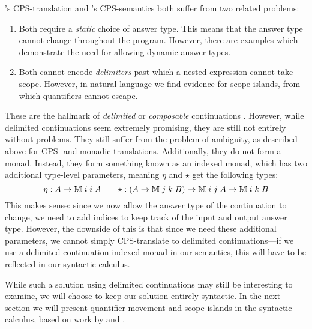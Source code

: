 \vspace*{1\baselineskip}

\citeauthor{barker2004}'s CPS-translation and
\citeauthor{moortgat2012}'s CPS-semantics both suffer from two related
problems:
\begin{enumerate}
\item Both require a \emph{static} choice of answer type. This
  means that the answer type cannot change throughout the
  program. However, there are examples which demonstrate the need for
  allowing dynamic answer types.
\item Both cannot encode \emph{delimiters} past which a nested
  expression cannot take scope. However, in natural language we find
  evidence for scope islands, from which quantifiers cannot escape.
\end{enumerate}
These are the hallmark of \emph{delimited} or \emph{composable}
continuations \citep{danvy1990}. However, while delimited
continuations seem extremely promising, they are still not entirely
without problems. They still suffer from the problem of ambiguity, as
described above for CPS- and monadic translations. Additionally, they
do not form a monad. Instead, they form something known as an indexed
monad, which has two additional type-level parameters, meaning $\eta$
and $\star$ get the following types:
\[
  \eta : A\rightarrow\mathbb{M}\;i\;i\;A
  \qquad
  \star: (A\rightarrow\mathbb{M}\;j\;k\;B)\rightarrow\mathbb{M}\;i\;j\;A\rightarrow\mathbb{M}\;i\;k\;B
\]
This makes sense: since we now allow the answer type of the
continuation to change, we need to add indices to keep track of the
input and output answer type. However, the downside of this is that
since we need these additional parameters, we cannot simply
CPS-translate to delimited continuations---if we use a delimited
continuation indexed monad in our semantics, this will have to be
reflected in our syntactic calculus.

While such a solution using delimited continuations may still be
interesting to examine, we will choose to keep our solution entirely
syntactic. In the next section we will present quantifier movement and
scope islands in the syntactic calculus, based on work by
\citet{moortgat1996} and \citet{barker2015}.
